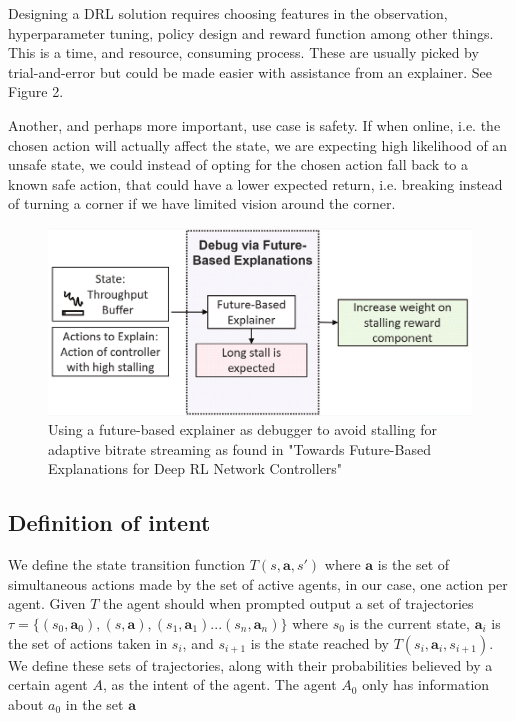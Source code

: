 \documentclass[UKenglish]{uiomasterthesis}
\begin{document}
Designing a DRL solution requires choosing features in the observation,\\ hyperparameter tuning, policy design and reward function among other things. This is a time, and resource, consuming process. These are usually picked by trial-and-error but could be made easier with assistance from an explainer. See Figure 2. 

Another, and perhaps more important, use case is safety. If when online, i.e. the chosen action will actually affect the state, we are expecting high likelihood of an unsafe state, we could instead of opting for the chosen action fall back to a known safe action, that could have a lower expected return, i.e. breaking instead of turning a corner if we have limited vision around the corner.

\begin{figure}
	\includegraphics[width=\textwidth]{images/dog-final.png}
	\caption{Using a future-based explainer as debugger to avoid stalling for adaptive bitrate streaming as found in "Towards Future-Based Explanations for Deep RL Network Controllers" \cite{10.1145/3626570.3626607}}
	\label{fig:environment}
\end{figure}
\medskip

\subsection{Definition of intent}
We define the state transition function $T(s, \textbf{a}, s')$ where $\textbf{a}$ is the set of simultaneous actions made by the set of active agents, in our case, one action per agent. Given $T$ the agent should when prompted output a set of trajectories $\tau = \{(s_0,\textbf{a}_0),(s,\textbf{a}),(s_1,\textbf{a}_1)...(s_n,\textbf{a}_n)\}$ where $s_0$ is the current state, $\textbf{a}_i$ is the set of actions taken in $s_i$, and $s_{i+1}$ is the state reached by $T(s_i,\textbf{a}_i, s_{i+1})$. We define these sets of trajectories, along with their probabilities believed by a certain agent $A$, as the intent of the agent. The agent $A_0$ only has information about $a_0$ in the set $\textbf{a}$
\end{document}
